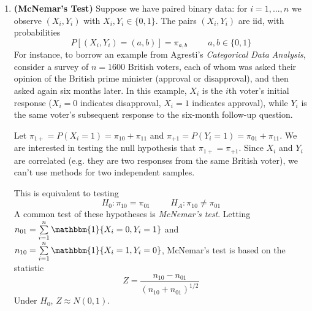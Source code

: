 \documentclass[11pt]{article}
\begin{document}
\begin{enumerate}
\begin{enumerate}
\item Now, for this part of the problem \textbf{only}, instead assume that $\sigma^2$ is unknown, but it \textit{is} known that $\theta_2 = \theta_3$ and $\theta_4 = \theta_5 = \theta_6$. We are interested in the quantity $\lambda = \theta_4 - \theta_3$.
\begin{enumerate}
\item Write down an estimator for $\lambda$ in terms of $X_1,...,X_6$.
\item Write down an estimator for $\sigma^2$ in terms of $X_1,...,X_6$.
\item Suggest a confidence interval based on the $t$ distribution for the quantity $\lambda = \theta_4 - \theta_3$. Make sure to specify the appropriate degrees of freedom.
\end{enumerate}
\end{enumerate}

\bigskip

\item \textbf{(McNemar's Test)} Suppose we have paired binary data: for $i = 1,...,n$ we observe $(X_i, Y_i)$ with $X_i, Y_i \in \{0,1\}$. The pairs $(X_i, Y_i)$ are iid, with probabilities
$$P[(X_i, Y_i) = (a, b)] = \pi_{a,b} \hspace{1cm} a,b \in \{0, 1\}$$
For instance, to borrow an example from Agresti's \textit{Categorical Data Analysis}, consider a survey of $n = 1600$ British voters, each of whom was asked their opinion of the British prime minister (approval or disapproval), and then asked again six months later. In this example, $X_i$ is the $i$th voter's initial response ($X_i = 0$ indicates disapproval, $X_i = 1$ indicates approval), while $Y_i$ is the same voter's subsequent response to the six-month follow-up question.

Let $\pi_{1+} = P(X_i = 1) = \pi_{10} + \pi_{11}$ and $\pi_{+1} = P(Y_i = 1) = \pi_{01} + \pi_{11}$. We are interested in testing the null hypothesis that $\pi_{1+} = \pi_{+1}$. Since $X_i$ and $Y_i$ are correlated (e.g. they are two responses from the same British voter), we can't use methods for two independent samples.

This is equivalent to testing
$$H_0: \pi_{10} = \pi_{01} \hspace{1cm} H_A: \pi_{10} \neq \pi_{01}$$
A common test of these hypotheses is \textit{McNemar's test}. Letting $n_{01} = \sum \limits_{i=1}^n \mathbbm{1}\{X_i = 0, Y_i = 1\}$ and $n_{10} = \sum \limits_{i=1}^n \mathbbm{1}\{X_i = 1, Y_i = 0\}$, McNemar's test is based on the statistic
$$Z = \dfrac{n_{10} - n_{01}}{(n_{10} + n_{01})^{1/2}}$$
Under $H_0$, $Z \approx N(0, 1)$.


\end{enumerate}
\end{document}
